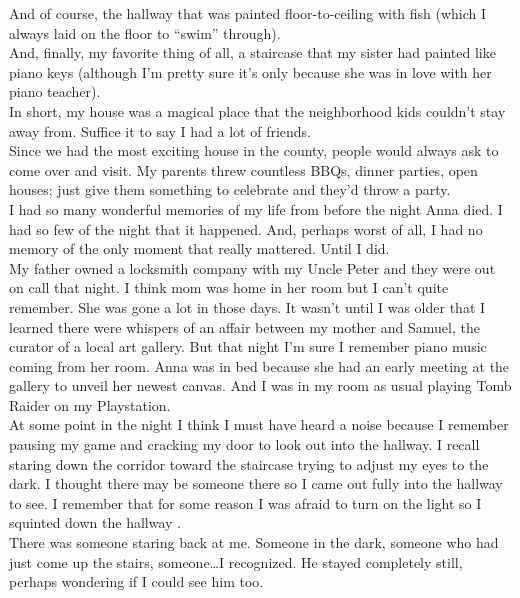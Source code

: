 \documentclass[a5paper]{scrartcl}
\begin{document}
And of course, the hallway that was painted floor-to-ceiling with fish (which I always laid on the floor to \enquote{swim} through).\\


And, finally, my favorite thing of all, a staircase that my sister had painted like piano keys (although I'm pretty sure it's only because she was in love with her piano teacher). \\


In short, my house was a magical place that the neighborhood kids couldn't stay away from. Suffice it to say I had a lot of friends.\\


Since we had the most exciting house in the county, people would always ask to come over and visit. My parents threw countless BBQs, dinner parties, open houses; just give them something to celebrate and they'd throw a party. \\


I had so many wonderful memories of my life from before the night Anna died. I had so few of the night that it happened. And, perhaps worst of all, I had no memory of the only moment that really mattered. Until I did. \\


My father owned a locksmith company with my Uncle Peter and they were out on call that night. I think mom was home in her room but I can't quite remember.  She was gone a lot in those days. It wasn't until I was older that I learned there were whispers of an affair between my mother and Samuel, the curator of a local art gallery. But that night I'm sure I remember piano music coming from her room. Anna was in bed because she had an early meeting at the gallery to unveil her newest canvas. And I was in my room as usual playing Tomb Raider on my Playstation. \\


At some point in the night I think I must have heard a noise because I remember pausing my game and cracking my door to look out into the hallway. I recall staring down the corridor toward the staircase trying to adjust my eyes to the dark. I thought there may be someone there so I came out fully into the hallway to see. I remember that for some reason I was afraid to turn on the light so I squinted down the hallway .\\


There was someone staring back at me. Someone in the dark, someone who had just come up the stairs, someone\dots I recognized. He stayed completely still, perhaps wondering if I could see him too. \\
\end{document}
